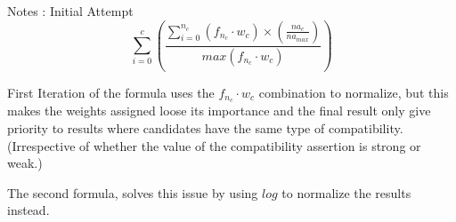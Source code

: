 \documentclass[11pt]{article}
\begin{document}
Notes : 
Initial Attempt
$$  \sum^{c}_{i=0}\left(  \frac{\sum^{n_{c}}_{i=0} \left( f_{n_{c}} \cdot w_{c}  \right) \times \left( \frac{na_{c}}{na_{max}}\right) }{max \left( f_{n_{c}} \cdot w_{c}  \right)}   \right)   $$

First Iteration of the formula uses the $f_{n_{c}} \cdot w_{c}$ combination to normalize, but this  makes the weights assigned loose its importance and the final result only give priority to results where candidates have the same type of compatibility. (Irrespective of whether the value of the compatibility assertion is strong or weak.) 

The second formula, solves this issue by using $log$ to normalize the results instead.\\
\end{document}
